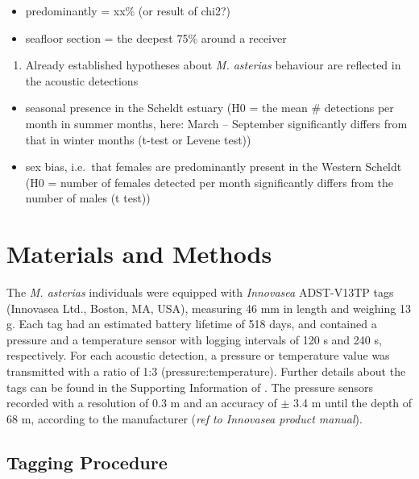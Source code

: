 \documentclass[
  authoryear,
  review,
  3p]{elsarticle}
\providecommand{\tightlist}{%
  \setlength{\itemsep}{0pt}\setlength{\parskip}{0pt}}\usepackage{longtable,booktabs,array}
\begin{document}
\begin{itemize}
\tightlist
\item
  predominantly = xx\% (or result of chi2?)
\item
  seafloor section = the deepest 75\% around a receiver
\end{itemize}

\begin{enumerate}
\def\labelenumi{\arabic{enumi}.}
\setcounter{enumi}{2}
\tightlist
\item
  Already established hypotheses about \emph{M. asterias} behaviour are
  reflected in the acoustic detections
\end{enumerate}

\begin{itemize}
\tightlist
\item
  seasonal presence in the Scheldt estuary (H0 = the mean \# detections
  per month in summer months, here: March -- September significantly
  differs from that in winter months (t-test or Levene test))
\item
  sex bias, i.e.~that females are predominantly present in the Western
  Scheldt (H0 = number of females detected per month significantly
  differs from the number of males (t test))
\end{itemize}

\hypertarget{sec-mm}{%
\section{Materials and Methods}\label{sec-mm}}

The \emph{M. asterias} individuals were equipped with \emph{Innovasea}
ADST-V13TP tags (Innovasea Ltd., Boston, MA, USA), measuring 46 mm in
length and weighing 13 g. Each tag had an estimated battery lifetime of
518 days, and contained a pressure and a temperature sensor with logging
intervals of 120 s and 240 s, respectively. For each acoustic detection,
a pressure or temperature value was transmitted with a ratio of 1:3
(pressure:temperature). Further details about the tags can be found in
the Supporting Information of \citet{goossens_2023}. The pressure
sensors recorded with a resolution of 0.3 m and an accuracy of \(\pm\)
3.4 m until the depth of 68 m, according to the manufacturer (\emph{ref
to Innovasea product manual}).

\hypertarget{tagging-procedure}{%
\subsection{Tagging Procedure}\label{tagging-procedure}}
\end{document}
